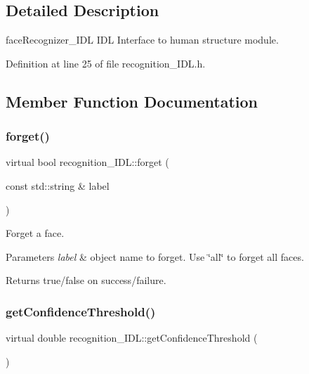 \subsection{Detailed Description}
face\+Recognizer\+\_\+\+I\+DL I\+DL Interface to human structure module. 

Definition at line 25 of file recognition\+\_\+\+I\+D\+L.\+h.



\subsection{Member Function Documentation}
\mbox{\label{classrecognition__IDL_a5ddaf7e807d0bb5685ee4b87e8817bf3}} 
\subsubsection{\texorpdfstring{forget()}{forget()}}
{\footnotesize\ttfamily virtual bool recognition\+\_\+\+I\+D\+L\+::forget (\begin{DoxyParamCaption}\item[{const std\+::string \&}]{label }\end{DoxyParamCaption})\hspace{0.3cm}{\ttfamily [virtual]}}



Forget a face. 


\begin{DoxyParams}{Parameters}
{\em label} & object name to forget. Use \char`\"{}all\char`\"{} to forget all faces. \\
\hline
\end{DoxyParams}
\begin{DoxyReturn}{Returns}
true/false on success/failure. 
\end{DoxyReturn}
\mbox{\label{classrecognition__IDL_a5cc457fe6b185acc8a4b1f541a002cee}} 
\subsubsection{\texorpdfstring{getConfidenceThreshold()}{getConfidenceThreshold()}}
{\footnotesize\ttfamily virtual double recognition\+\_\+\+I\+D\+L\+::get\+Confidence\+Threshold (\begin{DoxyParamCaption}{ }\end{DoxyParamCaption})\hspace{0.3cm}{\ttfamily [virtual]}}



